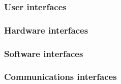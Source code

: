 \subsubsection{User interfaces}


\subsubsection{Hardware interfaces}


\subsubsection{Software interfaces}

\subsubsection{Communications interfaces}



